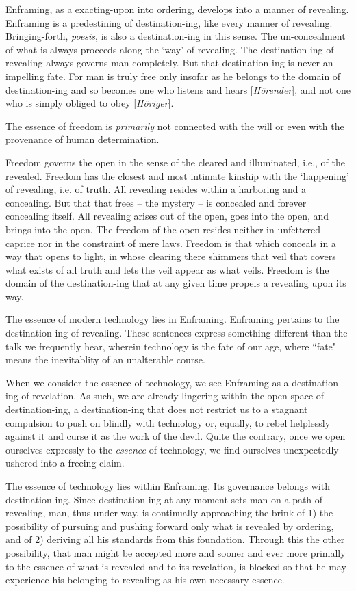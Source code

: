 \documentclass[12pt]{article}
\begin{document}
Enframing, as a exacting-upon into ordering, develops into a manner of revealing. Enframing is a predestining of destination-ing, like every manner of revealing. Bringing-forth, \textit{po{\-e}sis}, is also a destination-ing in this sense. The un-concealment of what is always proceeds along the `way' of revealing. The destination-ing of revealing always governs man completely. But that destination-ing is never an impelling fate. For man is truly free only insofar as he belongs to the domain of destination-ing and so becomes one who listens and hears [\textit{H{\"o}render}], and not one who is simply obliged to obey [\textit{H{\"o}riger}].

The essence of freedom is \textit{primarily} not connected with the will or even with the provenance of human determination.

Freedom governs the open in the sense of the cleared and illuminated, i.e., of the revealed. Freedom has the closest and most intimate kinship with the `happening' of revealing, i.e. of truth. All revealing resides within a harboring and a concealing. But that that frees -- the mystery -- is concealed and forever concealing itself. All revealing arises out of the open, goes into the open, and brings into the open. The freedom of the open resides neither in unfettered caprice nor in the constraint of mere laws. Freedom is that which conceals in a way that opens to light, in whose clearing there shimmers that veil that covers what exists of all truth and lets the veil appear as what veils. Freedom is the domain of the destination-ing that at any given time propels a revealing upon its way.

The essence of modern technology lies in Enframing. Enframing pertains to the destination-ing of revealing. These sentences express something different than the talk we frequently hear, wherein technology is the fate of our age, where ``fate" means the inevitablity of an unalterable course.

When we consider the essence of technology, we see Enframing as a destination-ing of revelation. As such, we are already lingering within the open space of destination-ing, a destination-ing that does not restrict us to a stagnant compulsion to push on blindly with technology or, equally, to rebel helplessly against it and curse it as the work of the devil. Quite the contrary, once we open ourselves expressly to the \textit{essence} of technology, we find ourselves unexpectedly ushered into a freeing claim.

The essence of technology lies within Enframing. Its governance belongs with destination-ing. Since destination-ing at any moment sets man on a path of revealing, man, thus under way, is continually approaching the brink of 1) the possibility of pursuing and pushing forward only what is revealed by ordering, and of 2) deriving all his standards from this foundation. Through this the other possibility, that man might be accepted more and sooner and ever more primally to the essence of what is revealed and to its revelation, is blocked so that he may experience his belonging to revealing as his own necessary essence.
\end{document}
